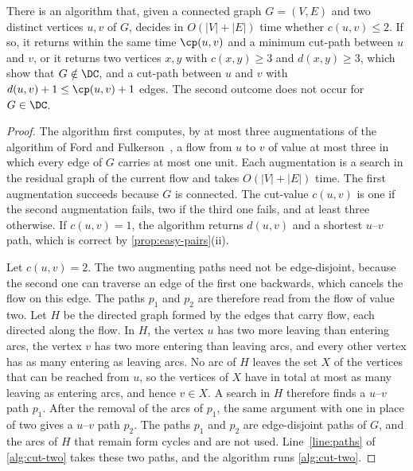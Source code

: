 \begin{theorem}
\label{thm:linear-time}
There is an algorithm that, given a connected graph $G = (V, E)$ and two distinct vertices $u, v$ of $G$, decides in $O(|V| + |E|)$ time whether $c(u, v) \leq 2$.
If so, it returns within the same time $\cp(u, v)$ and a minimum cut-path between $u$ and $v$, or it returns two vertices $x, y$ with $c(x, y) \geq 3$ and $d(x, y) \geq 3$, which show that $G \notin \DC$, and a cut-path between $u$ and $v$ with $d(u, v) + 1 \leq \cp(u, v) + 1$ edges.
The second outcome does not occur for $G \in \DC$.
\end{theorem}

\begin{proof}
The algorithm first computes, by at most three augmentations of the algorithm of Ford and Fulkerson~\cite[Section~10.4]{Erickson2019Algorithms}, a flow from $u$ to $v$ of value at most three in which every edge of $G$ carries at most one unit.
Each augmentation is a search in the residual graph of the current flow and takes $O(|V| + |E|)$ time.
The first augmentation succeeds because $G$ is connected.
The cut-value $c(u, v)$ is one if the second augmentation fails, two if the third one fails, and at least three otherwise.
If $c(u, v) = 1$, the algorithm returns $d(u, v)$ and a shortest $u$--$v$ path, which is correct by \cref{prop:easy-pairs}(ii).

Let $c(u, v) = 2$.
The two augmenting paths need not be edge-disjoint, because the second one can traverse an edge of the first one backwards, which cancels the flow on this edge.
The paths $p_1$ and $p_2$ are therefore read from the flow of value two.
Let $H$ be the directed graph formed by the edges that carry flow, each directed along the flow.
In $H$, the vertex $u$ has two more leaving than entering arcs, the vertex $v$ has two more entering than leaving arcs, and every other vertex has as many entering as leaving arcs.
No arc of $H$ leaves the set $X$ of the vertices that can be reached from $u$, so the vertices of $X$ have in total at most as many leaving as entering arcs, and hence $v \in X$.
A search in $H$ therefore finds a $u$--$v$ path $p_1$.
After the removal of the arcs of $p_1$, the same argument with one in place of two gives a $u$--$v$ path $p_2$.
The paths $p_1$ and $p_2$ are edge-disjoint paths of $G$, and the arcs of $H$ that remain form cycles and are not used.
Line~\ref{line:paths} of \cref{alg:cut-two} takes these two paths, and the algorithm runs \cref{alg:cut-two}.


\end{proof}
